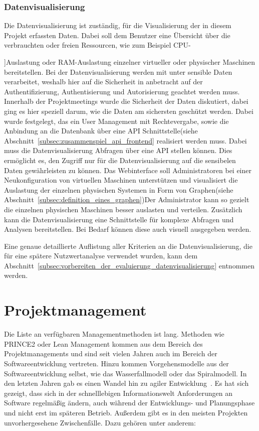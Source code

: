 \subsection{Datenvisualisierung}
Die Datenvisualisierung ist zuständig, für die Visualisierung der in diesem
Projekt erfassten Daten.  Dabei soll dem Benutzer eine Übersicht über die
verbrauchten oder freien Ressourcen, wie zum Beispiel CPU\hyp{]Auslastung oder
RAM-Auslastung einzelner virtueller oder physischer Maschinen bereitstellen.
Bei der Datenvisualisierung werden mit unter sensible Daten verarbeitet,
weshalb hier auf die Sicherheit in anbetracht auf der Authentifizierung,
Authentisierung und Autorisierung geachtet werden muss. Innerhalb der
Projektmeetings wurde die Sicherheit der Daten diskutiert, dabei ging es hier
speziell darum, wie die Daten am sichersten geschützt werden. Dabei wurde
festgelegt, das ein User Management mit Rechtevergabe, sowie die Anbindung an
die Datenbank über eine API Schnittstelle(siehe
Abschnitt~\ref{subsec:zusammenspiel_api_frontend} realisiert werden muss.
Dabei muss die Datenvisualisierung Abfragen über eine API stellen können. Dies
ermöglicht es, den Zugriff nur für die Datenvisualisierung auf die sensibelen
Daten gewährleisten zu können. Das Webinterface soll Administratoren bei einer
Neukonfiguration von virtuellen Maschinen unterstützen und visualisiert die
Auslastung der einzelnen physischen Systemen in Form von Graphen(siehe
Abschnitt~\ref{subsec:definition_eines_graphen})Der Administrator kann so
gezielt die einzelnen physischen Maschinen besser auslasten und verteilen.
Zusätzlich kann die Datenvisualisierung eine Schnittstelle für komplexe
Abfragen und Analysen bereitstellen. Bei Bedarf können diese auch visuell
ausgegeben werden.

Eine genaue detaillierte Auflistung aller Kriterien an die Datenvisualisierung,
die für eine spätere Nutzwertanalyse verwendet wurden, kann dem
Abschnitt~\ref{subsec:vorbereiten_der_evaluierung_datenvisualisierung}
entnommen werden.

\mr%

\chapter{Projektmanagement}
Die Liste an verfügbaren Managementmethoden ist lang. Methoden wie PRINCE2 oder
Lean Management kommen aus dem Bereich des Projektmanagements und sind seit
vielen Jahren auch im Bereich der Softwareentwicklung vertreten. Hinzu kommen
Vorgehensmodelle aus der Softwareentwicklung selbst, wie das Wasserfallmodell
oder das Spiralmodell. In den letzten Jahren gab es einen Wandel hin zu agiler
Entwicklung~\cite{beck2001manifesto}. Es hat sich gezeigt, dass sich in der
schnelllebigen Informationswelt Anforderungen an Software regelmäßig ändern,
auch während der Entwicklungs- und Planungsphase und nicht erst im späteren
Betrieb. Außerdem gibt es in den meisten Projekten unvorhergesehene
Zwischenfälle. Dazu gehören unter anderem:

}
